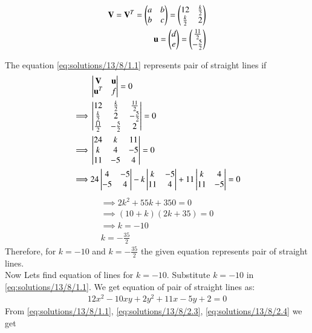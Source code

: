 \begin{align}
    \mathbf{V}=\mathbf{V}^T=\begin{pmatrix}a & b \\ b & c\end{pmatrix}=\begin{pmatrix}12 & \frac{k}{2} \\ \frac{k}{2} & 2\end{pmatrix}\label{eq:solutions/13/8/2.3}\\
    \mathbf{u}=\begin{pmatrix}d \\ e\end{pmatrix}=\begin{pmatrix}\frac{11}{2} \\ -\frac{5}{2}\end{pmatrix}\label{eq:solutions/13/8/2.4}
\end{align}

The equation \eqref{eq:solutions/13/8/1.1} represents pair of straight lines if
\begin{align}
    &\begin{vmatrix}\mathbf{V} & \mathbf{u} \\ \mathbf{u}^T & f\end{vmatrix}=0\\
    \implies&\begin{vmatrix}12 & \frac{k}{2} & \frac{11}{2} \\ \frac{k}{2} & 2 & -\frac{5}{2} \\ \frac{11}{2} & -\frac{5}{2} & 2\end{vmatrix}=0\label{eq:solutions/13/8/2.6}\\
    \implies&\begin{vmatrix}24 & k & 11 \\ k & 4 & -5 \\ 11 & -5 & 4\end{vmatrix}=0\\
    \implies&24\begin{vmatrix} 4 & -5 \\ -5 & 4\end{vmatrix}-k\begin{vmatrix} k & -5 \\ 11 & 4\end{vmatrix}+11\begin{vmatrix} k & 4 \\ 11 & -5\end{vmatrix}=0
\end{align}
\begin{align}
    \implies2k^2+55k+350=0\\
    \implies(10+k)(2k+35)=0\\
    \implies k=-10\nonumber\\
    k=-\frac{35}{2}
\end{align}
Therefore, for $k=-10$ and $k=-\frac{35}{2}$ the given equation represents pair of straight lines.\\
Now Lets find equation of lines for $k=-10$.
\noindent
Substitute $k=-10$ in \eqref{eq:solutions/13/8/1.1}. We get equation of pair of straight lines as:
\begin{align}
    12x^2-10xy+2y^2+11x-5y+2=0
\end{align}
From \eqref{eq:solutions/13/8/1.1}, \eqref{eq:solutions/13/8/2.3}, \eqref{eq:solutions/13/8/2.4} we get
